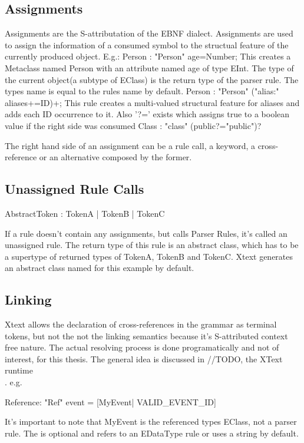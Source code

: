 \subsection{Assignments}
Assignments are the S-attributation of the EBNF dialect. Assignments are used to assign the information of a consumed symbol to the structual feature of the currently produced object. E.g.:
Person : "Person" age=Number;
This creates a Metaclass named Person with an attribute named age of type EInt. 
The type of the current object(a subtype of EClass) is the return type of the parser rule. The types name is equal to the rules name by default.
Person : "Person" ("alias:" aliases+=ID)+;
This rule creates a multi-valued structural feature for aliases and adds each ID occurrence to it. Also '?=' exists which assigns true to a boolean value if the right side was consumed
Class : "class" (public?="public")?

The right hand side of an assignment can be a rule call, a keyword, a cross-reference or an alternative composed by the former.

\subsection{Unassigned Rule Calls}
\begin{xtxt}
AbstractToken :	TokenA |	TokenB |	TokenC
\end{xtxt}
If a rule doesn't contain any assignments, but calls Parser Rules, it's called an unassigned rule. The return type of this rule is an abstract class, which has to be a supertype of returned types of TokenA, TokenB and TokenC. Xtext generates an abstract class named  for this example by default.

\subsection{Linking}
Xtext allows the declaration of cross-references in the grammar as terminal tokens, but not the not the linking semantics because it's S-attributed context free nature. The actual resolving process is done programatically and not of interest, for this thesis. The general idea is discussed in //TODO, the XText runtime\\.
e.g. 
\begin{xtxt}
Reference:  "Ref" event = [MyEvent| VALID_EVENT_ID]
\end{xtxt}
It's important to note that MyEvent is the referenced types EClass, not a parser rule. The   is optional and refers to an EDataType rule or uses a string by default.

